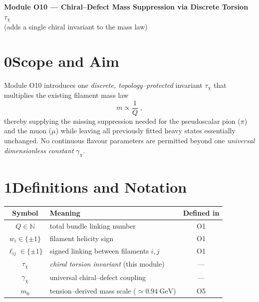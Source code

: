 \documentclass{article}
\begin{document}
\begin{center}
\Large\textbf{Module O10 --- Chiral--Defect Mass Suppression via Discrete Torsion $\tau_\chi$}\\[0.5em]
\large(adds a single chiral invariant to the mass law)
\end{center}

\section*{0\quad Scope and Aim}
Module O10 introduces one \emph{discrete, topology--protected} invariant
$\tau_\chi$ that multiplies the existing filament mass law
\[ m \propto \frac{1}{Q}\;, \]
thereby supplying the missing suppression needed for the pseudoscalar pion
($\pi$) and the muon ($\mu$) while leaving all previously fitted heavy states
essentially unchanged.
No continuous flavour parameters are permitted beyond one
\emph{universal dimensionless constant} $\gamma_\chi$.

\section*{1\quad Definitions and Notation}
\begin{center}
\begin{tabular}{|c|p{9cm}|c|}
\hline
Symbol & Meaning & Defined in\\\hline
$Q\in\mathbb N$ & total bundle linking number & O1\\
$w_i\in\{\pm1\}$ & filament helicity sign & O1\\
$\ell_{ij}\in\{\pm1\}$ & signed linking between filaments $i,j$ & O1\\
$\tau_\chi$ & \emph{chiral torsion invariant} (this module) & ---\\
$\gamma_\chi$ & universal chiral--defect coupling & ---\\
$m_0$ & tension--derived mass scale ($\simeq 0.94\ \text{GeV}$) & O5\\\hline
\end{tabular}
\end{center}
\end{document}
